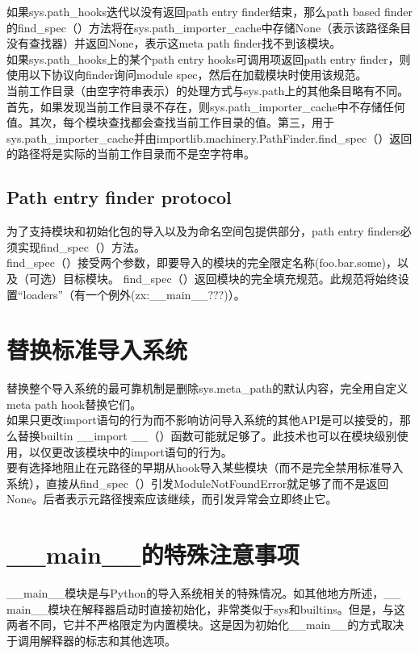 \documentclass[10pt,UTF8]{ctexart}
\begin{document}
\indent 如果sys.path_hooks迭代以没有返回path entry finder结束，那么path based finder的find_spec（）方法将在sys.path_importer_cache中存储None（表示该路径条目没有查找器）并返回None，表示这meta path finder找不到该模块。\\
\indent 如果sys.path_hooks上的某个path entry hooks可调用项返回path entry finder，则使用以下协议向finder询问module spec，然后在加载模块时使用该规范。\\
\indent 当前工作目录（由空字符串表示）的处理方式与sys.path上的其他条目略有不同。首先，如果发现当前工作目录不存在，则sys.path_importer_cache中不存储任何值。其次，每个模块查找都会查找当前工作目录的值。第三，用于sys.path_importer_cache并由importlib.machinery.PathFinder.find_spec（）返回的路径将是实际的当前工作目录而不是空字符串。
\subsection{Path entry finder protocol}
为了支持模块和初始化包的导入以及为命名空间包提供部分，path  entry finders必须实现find_spec（）方法。\\
\indent find_spec（）接受两个参数，即要导入的模块的完全限定名称(foo.bar.some)，以及（可选）目标模块。 find_spec（）返回模块的完全填充规范。此规范将始终设置“loaders”（有一个例外(zx:__main__???)）。

\section{替换标准导入系统}
替换整个导入系统的最可靠机制是删除sys.meta_path的默认内容，完全用自定义meta path hook替换它们。\\
\indent 如果只更改import语句的行为而不影响访问导入系统的其他API是可以接受的，那么替换builtin __import __（）函数可能就足够了。此技术也可以在模块级别使用，以仅更改该模块中的import语句的行为。\\
\indent 要有选择地阻止在元路径的早期从hook导入某些模块（而不是完全禁用标准导入系统），直接从find_spec（）引发ModuleNotFoundError就足够了而不是返回None。后者表示元路径搜索应该继续，而引发异常会立即终止它。
\section{__main__的特殊注意事项}
__main__模块是与Python的导入系统相关的特殊情况。如其他地方所述，__ main__模块在解释器启动时直接初始化，非常类似于sys和builtins。但是，与这两者不同，它并不严格限定为内置模块。这是因为初始化__main__的方式取决于调用解释器的标志和其他选项。
\end{document}
